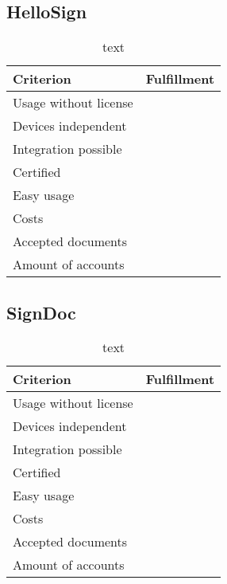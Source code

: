 \subsection{HelloSign}


\begin{table}[h]
	\begin{tabular}{|p{4cm}|p{10cm}|} \hline
		Criterion & Fulfillment \\ \hline
		Usage without license & \\ \hline
		Devices independent & \\ \hline
		Integration possible & \\ \hline
		Certified & \\ \hline
		Easy usage & \\ \hline
		Costs & \\ \hline
		Accepted documents & \\ \hline
		Amount of accounts & \\ \hline
	\end{tabular}
	\caption{text}
	\label{key}
\end{table}

\subsection{SignDoc}


\begin{table}[h]
	\begin{tabular}{|p{4cm}|p{10cm}|} \hline
		Criterion & Fulfillment \\ \hline
		Usage without license & \\ \hline
		Devices independent & \\ \hline
		Integration possible & \\ \hline
		Certified & \\ \hline
		Easy usage & \\ \hline
		Costs & \\ \hline
		Accepted documents & \\ \hline
		Amount of accounts & \\ \hline
	\end{tabular}
	\caption{text}
	\label{key}
\end{table}

